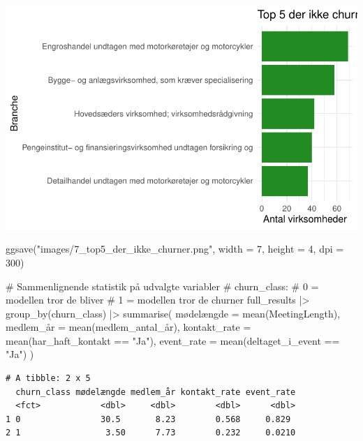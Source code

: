 \documentclass[
  11pt,
  letterpaper,
  DIV=11,
  numbers=noendperiod]{scrartcl}
\newenvironment{Shaded}{\begin{snugshade}}{\end{snugshade}}
\newcommand{\AttributeTok}[1]{\textcolor[rgb]{0.40,0.45,0.13}{#1}}
\newcommand{\CommentTok}[1]{\textcolor[rgb]{0.37,0.37,0.37}{#1}}
\newcommand{\DecValTok}[1]{\textcolor[rgb]{0.68,0.00,0.00}{#1}}
\newcommand{\FunctionTok}[1]{\textcolor[rgb]{0.28,0.35,0.67}{#1}}
\newcommand{\NormalTok}[1]{\textcolor[rgb]{0.00,0.23,0.31}{#1}}
\newcommand{\OtherTok}[1]{\textcolor[rgb]{0.00,0.23,0.31}{#1}}
\newcommand{\SpecialCharTok}[1]{\textcolor[rgb]{0.37,0.37,0.37}{#1}}
\newcommand{\StringTok}[1]{\textcolor[rgb]{0.13,0.47,0.30}{#1}}
\begin{document}
\includegraphics{Quarto_files/figure-pdf/unnamed-chunk-16-4.pdf}

\begin{Shaded}
\begin{Highlighting}[]
\FunctionTok{ggsave}\NormalTok{(}\StringTok{"images/7\_top5\_der\_ikke\_churner.png"}\NormalTok{, }\AttributeTok{width =} \DecValTok{7}\NormalTok{, }\AttributeTok{height =} \DecValTok{4}\NormalTok{, }\AttributeTok{dpi =} \DecValTok{300}\NormalTok{)}

\CommentTok{\# Sammenlignende statistik på udvalgte variabler}
\CommentTok{\# churn\_class:}
\CommentTok{\# 0 = modellen tror de bliver}
\CommentTok{\# 1 = modellen tror de churner}
\NormalTok{full\_results }\SpecialCharTok{|\textgreater{}} 
  \FunctionTok{group\_by}\NormalTok{(churn\_class) }\SpecialCharTok{|\textgreater{}} 
  \FunctionTok{summarise}\NormalTok{(}
\NormalTok{    mødelængde }\OtherTok{=} \FunctionTok{mean}\NormalTok{(MeetingLength),}
\NormalTok{    medlem\_å}\AttributeTok{r =} \FunctionTok{mean}\NormalTok{(medlem\_antal\_år),}
    \AttributeTok{kontakt\_rate =} \FunctionTok{mean}\NormalTok{(har\_haft\_kontakt }\SpecialCharTok{==} \StringTok{"Ja"}\NormalTok{),}
    \AttributeTok{event\_rate =} \FunctionTok{mean}\NormalTok{(deltaget\_i\_event }\SpecialCharTok{==} \StringTok{"Ja"}\NormalTok{)}
\NormalTok{  )}
\end{Highlighting}
\end{Shaded}

\begin{verbatim}
# A tibble: 2 x 5
  churn_class mødelængde medlem_år kontakt_rate event_rate
  <fct>            <dbl>     <dbl>        <dbl>      <dbl>
1 0                30.5       8.23        0.568     0.829 
2 1                 3.50      7.73        0.232     0.0210
\end{verbatim}
\end{document}
